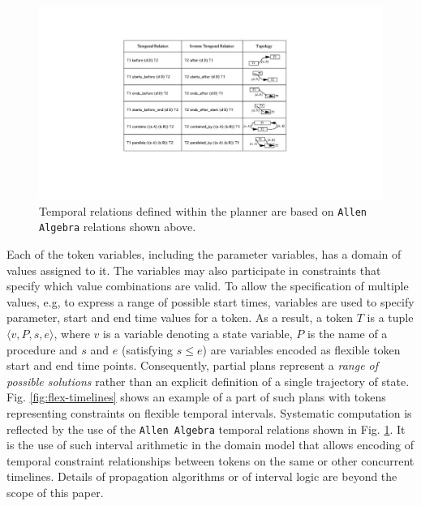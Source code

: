 \begin{figure}
\centering
\includegraphics[scale=0.3]{figs/Allen-algebra.pdf}
\caption{\small Temporal relations defined within the planner are
  based on \texttt{Allen Algebra} relations shown above.}
\label{fig:allen-algebra}
\vskip-0.3cm
\end{figure}
 
Each of the token variables, including the parameter variables, has a
domain of values assigned to it.  The variables may also participate
in constraints that specify which value combinations are valid.  To
allow the specification of multiple values, e.g, to express a range of
possible start times, variables are used to specify parameter, start
and end time values for a token.  As a result, a token $T$ is a tuple
$\langle v, P, s, e \rangle$, where $v$ is a variable denoting a state
variable, $P$ is the name of a procedure and $s$ and $e$ (satisfying
$s\leq e$) are variables encoded as flexible token start and end time
points. Consequently, partial plans represent a \textit{range of
  possible solutions} rather than an explicit definition of a single
trajectory of state.  Fig. \ref{fig:flex-timelines} shows an example
of a part of such plans with tokens representing constraints on
flexible temporal intervals. Systematic computation is reflected by
the use of the \texttt{Allen Algebra} \cite{allen84} temporal
relations shown in Fig. \ref{fig:allen-algebra}. It is the use of such
interval arithmetic in the \eu domain model that allows
encoding of temporal constraint relationships between tokens on the
same or other concurrent timelines. Details of propagation algorithms
or of interval logic are beyond the scope of this paper.

